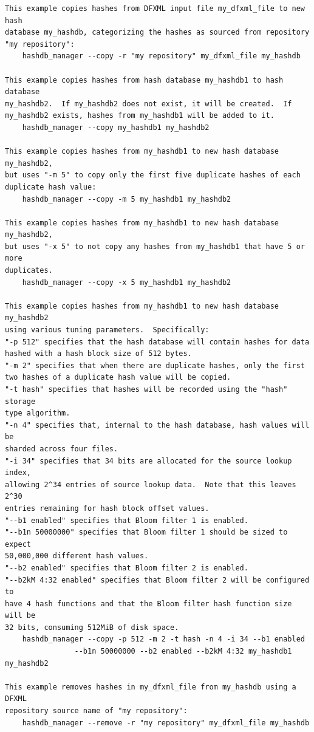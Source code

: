\documentclass[11pt,twoside]{article}
\begin{document}
\begin{small}
\begin{verbatim}
This example copies hashes from DFXML input file my_dfxml_file to new hash
database my_hashdb, categorizing the hashes as sourced from repository
"my repository":
    hashdb_manager --copy -r "my repository" my_dfxml_file my_hashdb

This example copies hashes from hash database my_hashdb1 to hash database
my_hashdb2.  If my_hashdb2 does not exist, it will be created.  If
my_hashdb2 exists, hashes from my_hashdb1 will be added to it.
    hashdb_manager --copy my_hashdb1 my_hashdb2

This example copies hashes from my_hashdb1 to new hash database my_hashdb2,
but uses "-m 5" to copy only the first five duplicate hashes of each
duplicate hash value:
    hashdb_manager --copy -m 5 my_hashdb1 my_hashdb2

This example copies hashes from my_hashdb1 to new hash database my_hashdb2,
but uses "-x 5" to not copy any hashes from my_hashdb1 that have 5 or more
duplicates.
    hashdb_manager --copy -x 5 my_hashdb1 my_hashdb2

This example copies hashes from my_hashdb1 to new hash database my_hashdb2
using various tuning parameters.  Specifically:
"-p 512" specifies that the hash database will contain hashes for data
hashed with a hash block size of 512 bytes.
"-m 2" specifies that when there are duplicate hashes, only the first
two hashes of a duplicate hash value will be copied.
"-t hash" specifies that hashes will be recorded using the "hash" storage
type algorithm.
"-n 4" specifies that, internal to the hash database, hash values will be
sharded across four files.
"-i 34" specifies that 34 bits are allocated for the source lookup index,
allowing 2^34 entries of source lookup data.  Note that this leaves 2^30
entries remaining for hash block offset values.
"--b1 enabled" specifies that Bloom filter 1 is enabled.
"--b1n 50000000" specifies that Bloom filter 1 should be sized to expect
50,000,000 different hash values.
"--b2 enabled" specifies that Bloom filter 2 is enabled.
"--b2kM 4:32 enabled" specifies that Bloom filter 2 will be configured to
have 4 hash functions and that the Bloom filter hash function size will be
32 bits, consuming 512MiB of disk space.
    hashdb_manager --copy -p 512 -m 2 -t hash -n 4 -i 34 --b1 enabled
                --b1n 50000000 --b2 enabled --b2kM 4:32 my_hashdb1 my_hashdb2

This example removes hashes in my_dfxml_file from my_hashdb using a DFXML
repository source name of "my repository":
    hashdb_manager --remove -r "my repository" my_dfxml_file my_hashdb


\end{verbatim}
\end{small}
\end{document}
